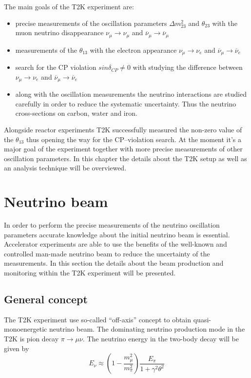 \documentclass[../main.tex]{subfiles}
\begin{document}
The main goals of the T2K experiment are:
\begin{itemize}
  \item precise measurements of the oscillation parameters $\Delta m^2_{23}$ and $\theta_{23}$ with the muon neutrino disappearance $\nu_\mu\to\nu_\mu$ and $\overline{\nu}_\mu\to\overline{\nu}_\mu$
  \item measurements of the  $\theta_{13}$ with the electron appearance $\nu_\mu\to\nu_e$ and $\overline{\nu}_\mu\to\overline{\nu}_e$
  \item search for the CP violation $sin\delta_{CP}\neq0$ with studying the difference between $\nu_\mu\to\nu_e$ and $\overline{\nu}_\mu\to\overline{\nu}_e$
  \item along with the oscillation measurements the neutrino interactions are studied carefully in order to reduce the systematic uncertainty. Thus the neutrino cross-sections on carbon, water and iron.
\end{itemize}

Alongside reactor experiments T2K successfully measured the non-zero value of the $\theta_{13}$ thus opening the way for the CP--violation search. At the moment it's a major goal of the experiment together with more precise measurements of other oscillation parameters. In this chapter the details about the T2K setup as well as an analysis technique will be overviewed.

\section{Neutrino beam}
\label{ch:T2K:nu_beam}

In order to perform the precise measurements of the neutrino oscillation parameters accurate knowledge about the initial neutrino beam is essential. Accelerator experiments are able to use the benefits of the well-known and controlled man-made neutrino beam to reduce the uncertainty of the measurements. In this section the details about the beam production and monitoring within the T2K experiment will be presented.
\subsection{General concept}
The T2K experiment use so-called ``off-axis'' concept to obtain quasi-monoenergetic neutrino beam. The dominating neutrino production mode in the T2K is pion decay $\pi\to\mu\nu$. The neutrino energy in the two-body decay will be given by
\begin{equation}
E_\nu\approx\left(1-\frac{m_\mu^2}{m_\pi^2}\right)\frac{E_\pi}{1+\gamma^2\theta^2}
\end{equation}
\end{document}
